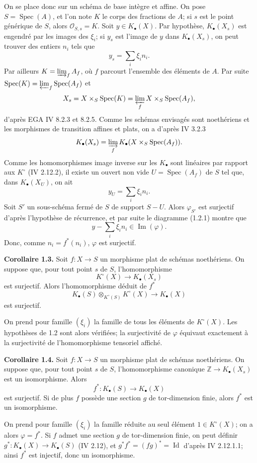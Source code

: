 \documentclass[11pt]{article}
\newcommand{\Spec}{\operatorname{Spec}}
\begin{document}
On se place donc sur un schéma de base intègre et affine. On pose $S=\Spec(A)$, et l'on note $K$ le corps des fractions de $A$; si $s$ est le point générique de $S$, alors $\mathcal O_{S,s}=K$. Soit $y\in K_\bullet(X)$. Par hypothèse, $K_\bullet(X_s)$ est engendré par les images des $\xi_i$; si $y_s$ est l'image de $y$ dans $K_\bullet(X_s)$, on peut trouver des entiers $n_i$ tels que
\[
y_s=\sum_i\xi_i n_i.
\]
Par ailleurs $K=\varinjlim_f A_f$, où $f$ parcourt l'ensemble des éléments de $A$. Par suite $\Spec(K)=\varprojlim_f\Spec(A_f)$ et
\[
X_s=X\times_S\Spec(K)=\varprojlim_f X\times_S\Spec(A_f),
\]
d'après EGA IV 8.2.3 et 8.2.5. Comme les schémas envisagés sont noethériens et les morphismes de transition affines et plats, on a d'après IV 3.2.3
\[
K_\bullet(X_s)=\varinjlim_f K_\bullet(X\times_S\Spec(A_f)).
\]
Comme les homomorphismes image inverse sur les $K_\bullet$ sont linéaires par rapport aux $K^\circ$ (IV 2.12.2), il existe un ouvert non vide $U=\Spec(A_f)$ de $S$ tel que, dans $K_\bullet(X_U)$, on ait
\[
y_U=\sum_i\xi_i n_i.
\]
Soit $S'$ un sous-schéma fermé de $S$ de support $S-U$. Alors $\varphi_{S'}$ est surjectif d'après l'hypothèse de récurrence, et par suite le diagramme (1.2.1) montre que
\[
y-\sum_i\xi_i n_i\in \operatorname{Im}(\varphi).
\]
Donc, comme $n_i=f^*(n_i)$, $\varphi$ est surjectif.

\textbf{Corollaire 1.3.} Soit $f:X\to S$ un morphisme plat de schémas noethériens. On suppose que, pour tout point $s$ de $S$, l'homomorphisme
\[
K^\circ(X)\longrightarrow K_\bullet(X_s)
\]
est surjectif. Alors l'homomorphisme déduit de $f^*$
\[
K_\bullet(S)\otimes_{K^\circ(S)}K^\circ(X)\longrightarrow K_\bullet(X)
\]
est surjectif.

On prend pour famille $(\xi_i)$ la famille de tous les éléments de $K^\circ(X)$. Les hypothèses de 1.2 sont alors vérifiées; la surjectivité de $\varphi$ équivaut exactement à la surjectivité de l'homomorphisme tensoriel affiché.

\textbf{Corollaire 1.4.} Soit $f:X\to S$ un morphisme plat de schémas noethériens. On suppose que, pour tout point $s$ de $S$, l'homomorphisme canonique $\mathbb Z\to K_\bullet(X_s)$ est un isomorphisme. Alors
\[
f^*:K_\bullet(S)\longrightarrow K_\bullet(X)
\]
est surjectif. Si de plus $f$ possède une section $g$ de tor-dimension finie, alors $f^*$ est un isomorphisme.

On prend pour famille $(\xi_i)$ la famille réduite au seul élément $1\in K^\circ(X)$; on a alors $\varphi=f^*$. Si $f$ admet une section $g$ de tor-dimension finie, on peut définir $g^*:K_\bullet(X)\to K_\bullet(S)$ (IV 2.12), et $g^*f^*=(fg)^*=\operatorname{Id}$ d'après IV 2.12.1.1; ainsi $f^*$ est injectif, donc un isomorphisme.
\end{document}
